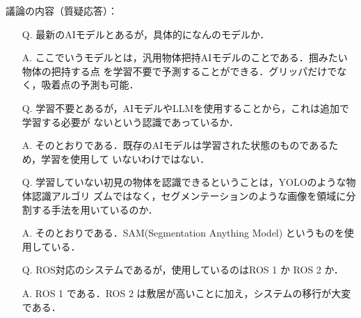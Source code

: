 \documentclass{jsarticle}
\begin{document}
\hspace*{4.7zw}議論の内容（質疑応答）：

\begin{itemize}
  \addtolength{\itemindent}{5.4zw}
  \item [Q.]最新のAIモデルとあるが，具体的になんのモデルか．
  \vspace*{1zh}

  \item [A.]ここでいうモデルとは，汎用物体把持AIモデルのことである．掴みたい物体の把持する点
  \hspace*{5.5zw}を学習不要で予測することができる．グリッパだけでなく，吸着点の予測も可能．\\
  \vspace*{1zh}

  \item [Q.]学習不要とあるが，AIモデルやLLMを使用することから，これは追加で学習する必要が
  \hspace*{5.5zw}ないという認識であっているか．
  \vspace*{1zh}

  \item [A.]そのとおりである．既存のAIモデルは学習された状態のものであるため，学習を使用して
  \hspace*{5.5zw}いないわけではない．\\
  \vspace*{1zh}

  \item [Q.]学習していない初見の物体を認識できるということは，YOLOのような物体認識アルゴリ
  \hspace*{5.5zw}ズムではなく，セグメンテーションのような画像を領域に分割する手法を用いているのか．
  
  \newpage

  \vspace*{-10zh}

  \item [A.]そのとおりである．SAM(Segmentation Anything Model) というものを使用している．\\
  \vspace*{1zh}

  \item [Q.]ROS対応のシステムであるが，使用しているのはROS 1 か ROS 2 か．
  \vspace*{1zh}

  \item [A.]ROS 1 である．ROS 2 は敷居が高いことに加え，システムの移行が大変である．\\

\end{itemize}
\end{document}
